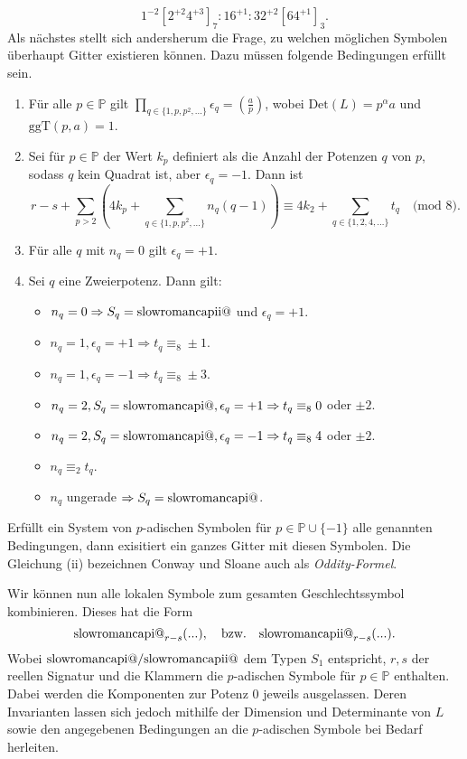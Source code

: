 \documentclass[12pt,a4paper,halfparskip,headsepline,bibtotocnumbered]{scrreprt}
\makeatletter
\theoremstyle{nummermitklammern}
\theoremstyle{nonumberbreak}
\renewcommand{\P}{\mathbb{P}}
\newcommand{\Det}{\text{Det}}
\renewcommand{\i}{\text{\expandafter\@slowromancap\romannumeral 1@}}
\newcommand{\ii}{\text{\expandafter\@slowromancap\romannumeral 2@}}
\newcommand{\ggT}{\text{ggT}}
\makeatother
\begin{document}
\begin{equation*}
	1^{-2} \left[2^{+2} 4^{+3} \right]_7 : 16^{+1} : 32^{+2} \left[ 64^{+1} \right]_3.
\end{equation*}
Als nächstes stellt sich andersherum die Frage, zu welchen möglichen Symbolen überhaupt Gitter existieren können. Dazu müssen folgende Bedingungen erfüllt sein.
\begin{enumerate}[label=(\roman*)]
	\item Für alle $p \in \P$ gilt $\prod_{q \in \lbrace 1, p, p^2, \dots \rbrace} \epsilon_q = \left( \frac{a}{p} \right)$, wobei $\Det(L) = p^\alpha a$ und $\ggT(p,a) = 1$.
	\item Sei für $p \in \P$ der Wert $k_p$ definiert als die Anzahl der Potenzen $q$ von $p$, sodass $q$ kein Quadrat ist, aber $\epsilon_q = -1$. Dann ist
		\begin{equation*}
			r - s + \sum_{p > 2} \left( 4 k_p + \sum_{q \in \lbrace 1, p, p^2, \dots \rbrace} n_q (q-1) \right) \equiv 4 k_2 + \sum_{q \in \lbrace 1, 2, 4, \dots \rbrace} t_q \quad \text{(mod } 8 \text{).}
		\end{equation*}
	\item Für alle $q$ mit $n_q = 0$ gilt $\epsilon_q = +1$.
	\item Sei $q$ eine Zweierpotenz. Dann gilt:
		\begin{itemize}
			\item $n_q = 0 \Rightarrow S_q = \ii$ und $\epsilon_q = +1$.
			\item $n_q = 1, \epsilon_q = +1 \Rightarrow t_q \equiv_8 \pm 1$.
			\item $n_q = 1, \epsilon_q = -1 \Rightarrow t_q \equiv_8 \pm 3$.
			\item $n_q = 2, S_q = \i, \epsilon_q = +1 \Rightarrow t_q \equiv_8 0$ oder $\pm 2$.
			\item $n_q = 2, S_q = \i, \epsilon_q = -1 \Rightarrow t_q \equiv_8 4$ oder $\pm 2$.
			\item $n_q \equiv_2 t_q$.
			\item $n_q$ ungerade $\Rightarrow S_q = \i$.
		\end{itemize}
\end{enumerate}
Erfüllt ein System von $p$-adischen Symbolen für $p \in \P \cup \lbrace -1 \rbrace$ alle genannten Bedingungen, dann exisitiert ein ganzes Gitter mit diesen Symbolen. Die Gleichung (ii) bezeichnen Conway und Sloane auch als \textit{Oddity-Formel}.\par
Wir können nun alle lokalen Symbole zum gesamten Geschlechtssymbol kombinieren. Dieses hat die Form
\begin{equation*}
	\i_{r-s}(...), \quad \text{bzw.}\quad \ii_{r-s}(...).
\end{equation*}
Wobei $\i/\ii$ dem Typen $S_1$ entspricht, $r,s$ der reellen Signatur und die Klammern die $p$-adischen Symbole für $p \in \P$ enthalten. Dabei werden die Komponenten zur Potenz $0$ jeweils ausgelassen. Deren Invarianten lassen sich jedoch mithilfe der Dimension und Determinante von $L$ sowie den angegebenen Bedingungen an die $p$-adischen Symbole bei Bedarf herleiten.
\end{document}
